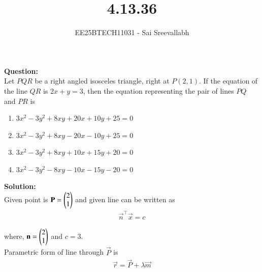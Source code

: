 \documentclass[journal]{IEEEtran}
\begin{document}

\vspace{3cm}

\title{4.13.36}
\author {EE25BTECH11031 - Sai Sreevallabh}
{\let\newpage\relax\maketitle}

\renewcommand{\thefigure}{\theenumi}
\renewcommand{\thetable}{\theenumi}
\setlength{\intextsep}{10pt} %


\renewcommand{\thetable}{\theenumi}

\textbf{Question: }\\

Let $PQR$ be a right angled isosceles triangle, right at $P(2, 1)$. If the equation of the line $QR$ is $2x + y = 3$, then the equation representing the pair of lines $PQ$ and $PR$ is 
    
\begin{multicols}{2}
    \begin{enumerate}
        \item $3x^2 - 3y^2 + 8xy + 20x + 10y + 25 = 0$
        \item $3x^2 - 3y^2 + 8xy - 20x - 10y + 25 = 0$
        \item $3x^2 - 3y^2 + 8xy + 10x + 15y + 20 = 0$
        \item $3x^2 - 3y^2 - 8xy - 10x - 15y - 20 = 0$
    \end{enumerate}
\end{multicols}


\textbf{Solution: }\\

Given point is $\mathbf{P} = \begin{pmatrix}2\\1\end{pmatrix}$ and given line can be written as 
\begin{align}
    \vec{n}^\top\vec{x} = c \label{eq1}
\end{align}

where, $\mathbf{n} = \begin{pmatrix}2\\1\end{pmatrix}$ and $c = 3$.\\

Parametric form of line through $\vec{P}$ is 
\begin{align}
    \vec{r} = \vec{P} + \lambda\vec{m}
\end{align}
\end{document}

